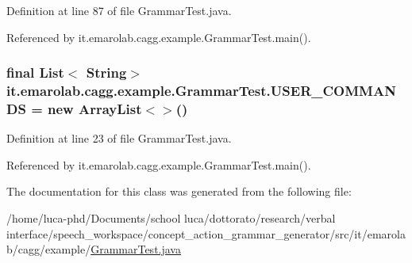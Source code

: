 Definition at line 87 of file Grammar\-Test.\-java.



Referenced by it.\-emarolab.\-cagg.\-example.\-Grammar\-Test.\-main().

\hypertarget{classit_1_1emarolab_1_1cagg_1_1example_1_1GrammarTest_a6084df26a61e4708954ed9aa8d128734}{
\subsubsection[{U\-S\-E\-R\-\_\-\-C\-O\-M\-M\-A\-N\-D\-S}]{\setlength{\rightskip}{0pt plus 5cm}final List$<$ String$>$ it.\-emarolab.\-cagg.\-example.\-Grammar\-Test.\-U\-S\-E\-R\-\_\-\-C\-O\-M\-M\-A\-N\-D\-S = new Array\-List$<$$>$()\hspace{0.3cm}{\ttfamily [static]}}}\label{classit_1_1emarolab_1_1cagg_1_1example_1_1GrammarTest_a6084df26a61e4708954ed9aa8d128734}


Definition at line 23 of file Grammar\-Test.\-java.



Referenced by it.\-emarolab.\-cagg.\-example.\-Grammar\-Test.\-main().



The documentation for this class was generated from the following file\-:\begin{DoxyCompactItemize}
\item 
/home/luca-\/phd/\-Documents/school luca/dottorato/research/verbal interface/speech\-\_\-workspace/concept\-\_\-action\-\_\-grammar\-\_\-generator/src/it/emarolab/cagg/example/\hyperlink{GrammarTest_8java}{Grammar\-Test.\-java}\end{DoxyCompactItemize}
